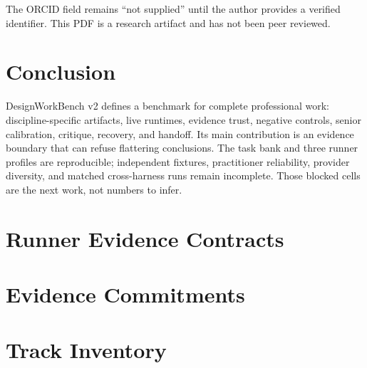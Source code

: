 \documentclass[10pt,twocolumn]{article}
\begin{document}
The ORCID field remains ``not supplied'' until the author provides a verified
identifier. This PDF is a research artifact and has not been peer reviewed.

\section{Conclusion}

DesignWorkBench v2 defines a benchmark for complete professional work:
discipline-specific artifacts, live runtimes, evidence trust, negative
controls, senior calibration, critique, recovery, and handoff. Its main
contribution is an evidence boundary that can refuse flattering conclusions.
The task bank and three runner profiles are reproducible; independent fixtures,
practitioner reliability, provider diversity, and matched cross-harness runs
remain incomplete. Those blocked cells are the next work, not numbers to infer.

\balance



\clearpage
\onecolumn
\appendix
\section{Runner Evidence Contracts}
\small


\section{Evidence Commitments}


\section{Track Inventory}
\end{document}
